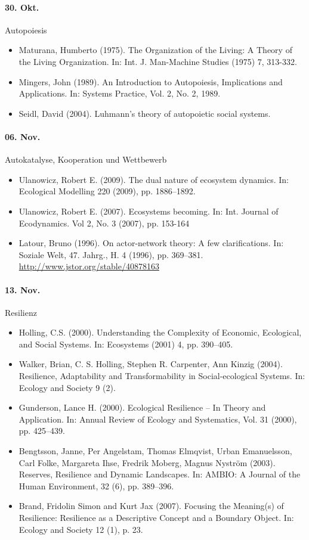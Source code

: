 \documentclass[11pt,a4paper]{article}
\begin{document}
\paragraph{30. Okt.}
Autopoiesis
\begin{itemize}
\item Maturana, Humberto (1975). The Organization of the Living: A Theory of
  the Living Organization. In: Int. J. Man-Machine Studies (1975) 7, 313-332.
\item Mingers, John (1989). An Introduction to Autopoiesis, Implications and
  Applications. In: Systems Practice, Vol. 2, No. 2, 1989. 
\item Seidl, David (2004). Luhmann’s theory of autopoietic social systems.
\end{itemize}

\paragraph{06. Nov.}
Autokatalyse, Kooperation und Wettbewerb
\begin{itemize}
\item Ulanowicz, Robert E. (2009). The dual nature of ecosystem dynamics.
  In: Ecological Modelling 220 (2009), pp. 1886–1892. 
\item Ulanowicz, Robert E. (2007).  Ecosystems becoming. In: Int. Journal of
  Ecodynamics. Vol 2, No. 3 (2007), pp. 153-164 
\item Latour, Bruno (1996). On actor-network theory: A few clarifications. In:
  Soziale Welt, 47. Jahrg., H. 4 (1996), pp. 369--381.
  \url{http://www.jstor.org/stable/40878163}
\end{itemize}

\paragraph{13. Nov.}
Resilienz
\begin{itemize}
\item Holling, C.S. (2000). Understanding the Complexity of Economic,
  Ecological, and Social Systems. In: Ecosystems (2001) 4, pp. 390–405. 
\item Walker, Brian, C. S. Holling, Stephen R. Carpenter, Ann Kinzig (2004).
  Resilience, Adaptability and Transformability in Social-ecological Systems. 
  In: Ecology and Society 9 (2).
\item Gunderson, Lance H. (2000). Ecological Resilience -- In Theory and
  Application. In: Annual Review of Ecology and Systematics, Vol. 31 (2000),
  pp. 425--439. 
\item Bengtsson, Janne, Per Angelstam, Thomas Elmqvist, Urban Emanuelsson,
  Carl Folke, Margareta Ihse, Fredrik Moberg, Magnus Nyström (2003).
  Reserves, Resilience and Dynamic Landscapes. In: AMBIO: A Journal of the
  Human Environment, 32 (6), pp. 389--396.  
\item Brand, Fridolin Simon and Kurt Jax (2007).  Focusing the Meaning(s) of
  Resilience: Resilience as a Descriptive Concept and a Boundary Object. In:
  Ecology and Society 12 (1), p. 23.
\end{itemize}
  
\end{document}
